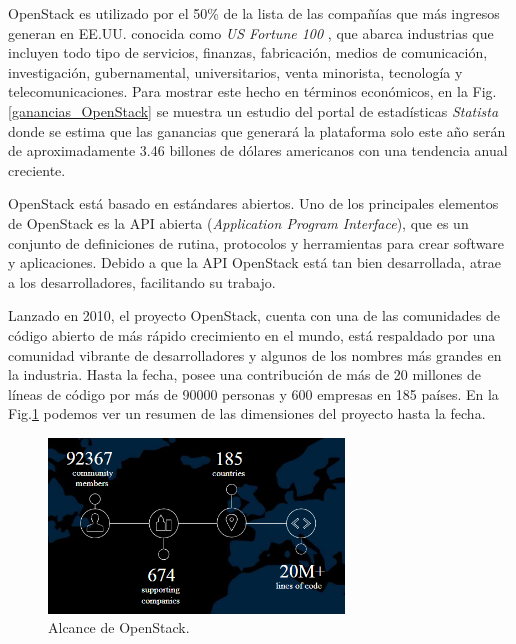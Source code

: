 OpenStack es utilizado por el 50\% de la lista de las compañías que más ingresos generan en EE.UU. conocida como \textit{US Fortune 100} \cite{noauthor_fortune_nodate}, que abarca industrias que incluyen todo tipo de servicios, finanzas, fabricación, medios de comunicación, investigación, gubernamental, universitarios, venta minorista, tecnología y telecomunicaciones. Para mostrar este hecho en términos económicos, en la Fig.\ref{ganancias_OpenStack} se muestra un estudio del portal de estadísticas \textit{Statista} \cite{noauthor_statistic_nodate} donde se estima que las ganancias que generará la plataforma solo este año serán de aproximadamente 3.46 billones de dólares americanos con una tendencia anual creciente.


OpenStack está basado en estándares abiertos.  Uno de los principales elementos de OpenStack es la API abierta (\textit{Application Program Interface}), que es un conjunto de definiciones de rutina, protocolos y herramientas para crear software y aplicaciones. Debido a que la API OpenStack está tan bien desarrollada, atrae a los desarrolladores, facilitando su trabajo.


Lanzado en 2010, el proyecto OpenStack, cuenta con una de las comunidades de código abierto de más rápido crecimiento en el mundo, está respaldado por una comunidad vibrante de desarrolladores y algunos de los nombres más grandes en la industria. Hasta la fecha, posee una contribución de más de 20 millones de líneas de código por más de 90000 personas y 600 empresas en 185 países. En la Fig.\ref{Alcance de OpenStack} podemos ver un resumen de las dimensiones del proyecto hasta la fecha.

\begin{figure}
    \centering
    \includegraphics[width=0.7\textwidth]{imagenes/capitulo2/community.png}
    \caption{Alcance de OpenStack.}
	\vspace{0.3cm}
    \label{Alcance de OpenStack}
\end{figure}

